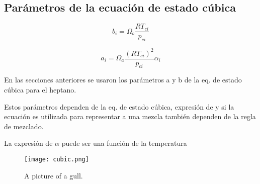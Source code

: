 \subsection{Parámetros de la ecuación de estado cúbica}

\begin{equation}
	b_i = \Omega_b \frac{R T_{ci}}{p_{ci}} 
\end{equation}

\begin{equation}
 a_i = \Omega_a \frac{\left(R T_{ci}\right)^2}{p_{ci}} \alpha_i
\end{equation}

En las secciones anteriores se usaron los parámetros a y b de la eq. de estado cúbica para el heptano. 

Estos parámetros dependen de la eq. de estado cúbica, expresión de \alpha y si la ecuación es utilizada para representar a una mezcla también dependen de la regla de mezclado.

La expresión de $\alpha$ puede ser una función de la temperatura





\begin{figure}[!h]
  
  \centering
    \texttt{[image: cubic.png]}
    \caption{A picture of a gull.}
\end{figure}


